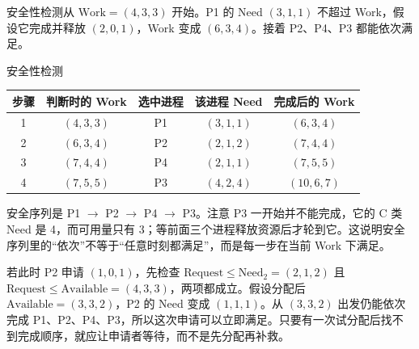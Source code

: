 安全性检测从 $\mathrm{Work}=(4,3,3)$ 开始。P1 的 Need $(3,1,1)$ 不超过 Work，假设它完成并释放 $(2,0,1)$，Work 变成 $(6,3,4)$。接着 P2、P4、P3 都能依次满足。

\begin{tablebox}{安全性检测}
\centering
\small
\begin{tabular}{|c|c|c|c|c|}
\hline
步骤 & 判断时的 Work & 选中进程 & 该进程 Need & 完成后的 Work \\
\hline
1 & $(4,3,3)$ & P1 & $(3,1,1)$ & $(6,3,4)$ \\
2 & $(6,3,4)$ & P2 & $(2,1,2)$ & $(7,4,4)$ \\
3 & $(7,4,4)$ & P4 & $(2,1,1)$ & $(7,5,5)$ \\
4 & $(7,5,5)$ & P3 & $(4,2,4)$ & $(10,6,7)$ \\
\hline
\end{tabular}
\end{tablebox}

安全序列是 P1 $\to$ P2 $\to$ P4 $\to$ P3。注意 P3 一开始并不能完成，它的 C 类 Need 是 4，而可用量只有 3；等前面三个进程释放资源后才轮到它。这说明安全序列里的“依次”不等于“任意时刻都满足”，而是每一步在当前 Work 下满足。

若此时 P2 申请 $(1,0,1)$，先检查 $\mathrm{Request}\le\mathrm{Need}_2=(2,1,2)$ 且 $\mathrm{Request}\le\mathrm{Available}=(4,3,3)$，两项都成立。假设分配后 $\mathrm{Available}=(3,3,2)$，P2 的 Need 变成 $(1,1,1)$。从 $(3,3,2)$ 出发仍能依次完成 P1、P2、P4、P3，所以这次申请可以立即满足。只要有一次试分配后找不到完成顺序，就应让申请者等待，而不是先分配再补救。

